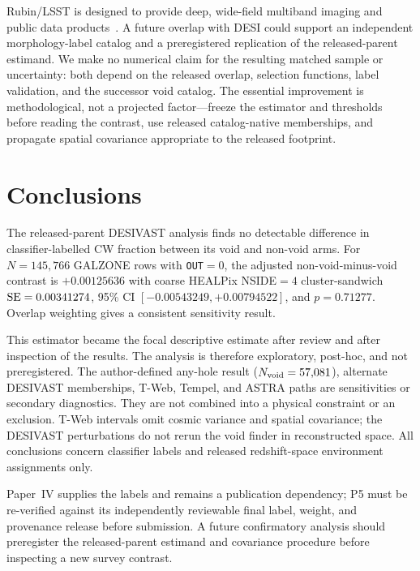 \documentclass[aps,prd,twocolumn,superscriptaddress,showpacs,preprintnumbers,nofootinbib,longbibliography,floatfix]{revtex4-2}
\begin{document}
Rubin/LSST is designed to provide deep, wide-field multiband imaging and
public data products~\cite{Ivezic2019}. A future overlap with DESI could
support an independent morphology-label catalog and a preregistered
replication of the released-parent estimand. We make no numerical claim
for the resulting matched sample or uncertainty: both depend on the
released overlap, selection functions, label validation, and the
successor void catalog. The essential improvement is methodological, not
a projected factor---freeze the estimator and thresholds before reading
the contrast, use released catalog-native memberships, and propagate
spatial covariance appropriate to the released footprint.

\section{Conclusions}\label{sec:conclusions}

The released-parent DESIVAST analysis finds no detectable difference in
classifier-labelled CW fraction between its void and non-void arms. For
$N=145{,}766$ GALZONE rows with \texttt{OUT}$=0$, the adjusted
non-void-minus-void contrast is $+0.00125636$ with coarse HEALPix
NSIDE$=4$ cluster-sandwich ${\rm SE}=0.00341274$, 95\% CI
$[-0.00543249,+0.00794522]$, and $p=0.71277$. Overlap weighting gives a
consistent sensitivity result.

This estimator became the focal descriptive estimate after review and after
inspection of the results. The analysis is therefore exploratory,
post-hoc, and not preregistered. The author-defined any-hole result
($N_{\rm void}=57{,}081$), alternate DESIVAST memberships, T-Web,
Tempel, and ASTRA paths are sensitivities or secondary diagnostics.
They are not combined into a physical constraint or an exclusion.
T-Web intervals omit cosmic variance and spatial covariance; the
DESIVAST perturbations do not rerun the void finder in reconstructed
space. All conclusions concern classifier labels and released
redshift-space environment assignments only.

Paper~IV supplies the labels and remains a publication dependency; P5 must
be re-verified against its independently reviewable final label, weight,
and provenance release before submission. A future confirmatory analysis
should preregister the released-parent
estimand and covariance procedure before inspecting a new survey
contrast.
\end{document}
